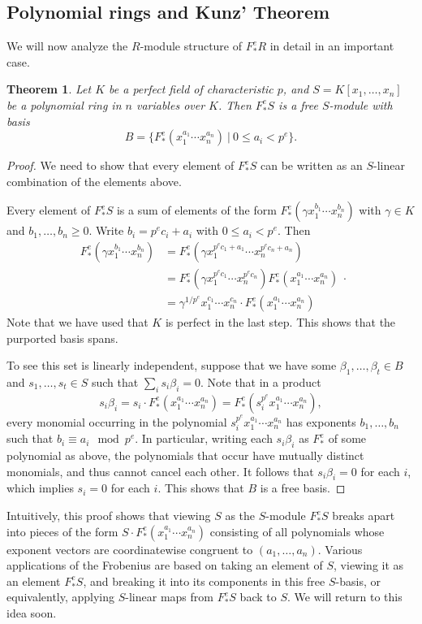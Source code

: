 \documentclass[12pt]{amsart}
\newtheorem{theorem}{Theorem}[section]
\theoremstyle{definition}
\numberwithin{equation}{theorem}
\begin{document}
\subsection*{Polynomial rings and Kunz' Theorem} We will now analyze the $R$-module structure of $F^e_*R$ in detail in an important case. 
\begin{theorem}\label{thm:perfectgens} Let $K$ be a perfect field of characteristic $p$, and $S=K[x_1,\dots,x_n]$ be a polynomial ring in $n$ variables over $K$. Then $F^e_*S$ is a free $S$-module with basis
\[ B= \{ F^e_*(x_1^{a_1} \cdots x_n^{a_n}) \ | \ 0\leq a_i < p^e \}.\]
\end{theorem}
\begin{proof}
We need to show that every element of $F^e_* S$ can be written as an $S$-linear combination of the elements above. 

Every element of $F^e_* S$ is a sum of elements of the form $F^e_*( \gamma x_1^{b_1} \cdots x_n^{b_n})$ with $\gamma \in K$ and $b_1,\dots,b_n \geq 0$. Write $b_i = p^e c_i + a_i$ with $0\leq a_i < p^e$. Then 
\[ \begin{aligned} F^e_*( \gamma x_1^{b_1} \cdots x_n^{b_n}) &= F^e_*( \gamma x_1^{p^e c_1 + a_1} \cdots x_n^{p^e c_n + a_n}) \\
&= F^e_*( \gamma x_1^{p^e c_1} \cdots x_n^{p^e c_n}) F^e_*(x_1^{a_1} \cdots x_n^{a_n}) \\
&= \gamma^{1/p^e} x_1^{c_1} \cdots x_n^{c_n} \cdot F^e_*(x_1^{a_1} \cdots x_n^{a_n})\end{aligned}.\]
Note that we have used that $K$ is perfect in the last step. This shows that the purported basis spans. 

To see this set is linearly independent, suppose that we have some $\beta_1,\dots,\beta_t\in B$ and ${s_1,\dots,s_t\in S}$ such that $\sum_i s_i \beta_i = 0$. Note that in a product
\[ s_i \beta_i = s_i \cdot F^e_*(x_1^{a_1} \cdots x_n^{a_n}) = F^e_*(s_i^{p^e} x_1^{a_1} \cdots x_n^{a_n}),\]
every monomial occurring in the polynomial $s_i^{p^e} x_1^{a_1} \cdots x_n^{a_n}$ has exponents $b_1,\dots,b_n$ such that $b_i \equiv a_i \mod p^e$. In particular, writing each $s_i \beta_i$ as $F^e_*$ of some polynomial as above, the polynomials that occur have mutually distinct monomials, and thus cannot cancel each other. It follows that $s_i \beta_i=0$ for each $i$, which implies $s_i=0$ for each $i$. This shows that $B$ is a free basis.
\end{proof}

Intuitively, this proof shows that viewing $S$ as the $S$-module $F^e_*S$ breaks apart into pieces of the form $S\cdot  F^e_*(x_1^{a_1} \cdots x_n^{a_n})$ consisting of all polynomials whose exponent vectors are coordinatewise congruent to $(a_1,\dots,a_n)$. Various applications of the Frobenius are based on taking an element of $S$, viewing it as an element $F^e_*S$, and breaking it into its components in this free $S$-basis, or equivalently, applying $S$-linear maps from $F^e_*S$ back to $S$. We will return to this idea soon.
\end{document}
